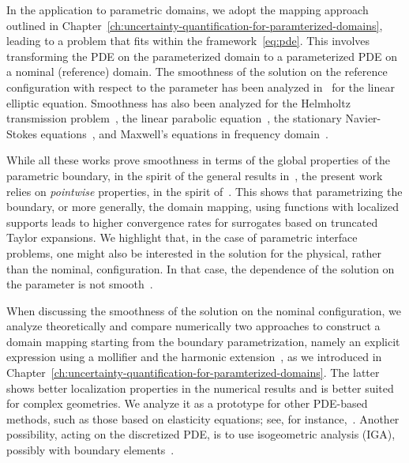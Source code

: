 In the application to parametric domains, we adopt the mapping approach outlined in Chapter~\ref{ch:uncertainty-quantification-for-paramterized-domains}, leading to a problem that fits within the framework~\eqref{eq:pde}.
This involves transforming the PDE on the parameterized domain to a parameterized PDE on a nominal (reference) domain.
The smoothness of the solution on the reference configuration with respect to the parameter has been analyzed in~\cite{castrillon-candas2016,harbrecht2016,multerer2019} for the linear elliptic equation.
Smoothness has also been analyzed for the Helmholtz transmission problem~\cite{hiptmair2018, hiptmair2024}, the linear parabolic equation~\cite{castrillon-candas2021}, the stationary Navier-Stokes equations~\cite{cohen2018}, and Maxwell's equations in frequency domain~\cite{jerez-hanckes2017}.

While all these works prove smoothness in terms of the global properties of the parametric boundary, in the spirit of the general results in~\cite{zhou2014, chkifa2015}, the present work relies on \textsl{pointwise} properties, in the spirit of~\cite{bachmayr2017,bachmayr2017a,dung2022,zech2018}.
This shows that parametrizing the boundary, or more generally, the domain mapping, using functions with localized supports leads to higher convergence rates for surrogates based on truncated Taylor expansions.
We highlight that, in the case of parametric interface problems, one might also be interested in the solution for the physical, rather than the nominal, configuration.
In that case, the dependence of the solution on the parameter is not smooth~\cite{motamed2013,scarabosio2017,scarabosio2022}.

When discussing the smoothness of the solution on the nominal configuration, we analyze theoretically and compare numerically two approaches to construct a domain mapping starting from the boundary parametrization, namely an explicit expression using a mollifier and the harmonic extension~\cite{li2001,xiu2006}, as we introduced in Chapter~\ref{ch:uncertainty-quantification-for-paramterized-domains}.
The latter shows better localization properties in the numerical results and is better suited for complex geometries.
We analyze it as a prototype for other PDE-based methods, such as those based on elasticity equations; see, for instance,~\cite{cizmas2008,dwight2009}.
Another possibility, acting on the discretized PDE, is to use isogeometric analysis (IGA), possibly with boundary elements~\cite{dolz2022,dolz2023}.